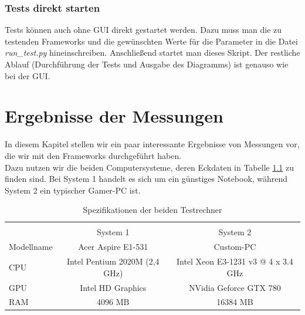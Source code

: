 \subsection{Tests direkt starten}
Tests können auch ohne GUI direkt gestartet werden. Dazu muss man die zu testenden Frameworks und die gewünschten Werte für die Parameter in die Datei \textit{run\_test.py} hineinschreiben. Anschließend startet man dieses Skript. Der restliche Ablauf (Durchführung der Tests und Ausgabe des Diagramms) ist genauso wie bei der GUI.

\chapter{Ergebnisse der Messungen}
\label{ch:results}
In diesem Kapitel stellen wir ein paar interessante Ergebnisse von Messungen vor, die wir mit den Frameworks durchgeführt haben.\\
Dazu nutzen wir die beiden Computersysteme, deren Eckdaten in Tabelle \ref{tab:allspecs} zu finden sind. Bei System 1 handelt es sich um ein günstiges Notebook, während System 2 ein typischer Gamer-PC ist.

\begin{table}
    \begin{tabular}{ | l | c | c |}
    \hline \\
    			& System 1						& System 2      						\\ \hline
    Modellname 	& Acer Aspire E1-531			& Custom-PC 							\\ \hline
    CPU 		& Intel Pentium 2020M (2,4 GHz) & Intel Xeon E3-1231 v3 @ 4 x 3.4 GHz 	\\ \hline
    GPU 		& Intel HD Graphics				& NVidia Geforce GTX 780				\\ \hline
    RAM 		& 4096 MB						& 16384 MB 								\\ \hline
    \end{tabular}
    \caption{Spezifikationen der beiden Testrechner}
   	\label{tab:allspecs}
\end{table}

